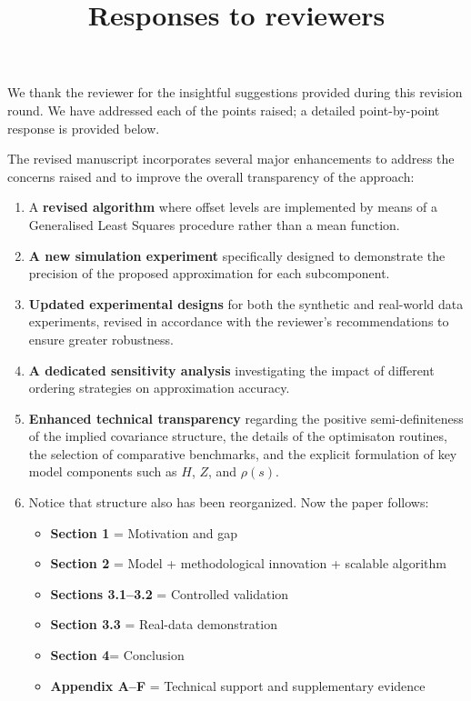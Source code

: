 \documentclass[12pt]{article}
\newcommand{\0}{\mathbf{0}}
\newcounter{reviewer}
\newcounter{point}[reviewer]
\begin{document}
\author{ }

\date{}
\title{Responses to reviewers}
\maketitle

\vspace*{-1.0cm}

\begin{sf}
\noindent \noindent We thank the reviewer for the insightful suggestions provided during this revision round. We have addressed each of the points raised; a detailed point-by-point response is provided below. 

\noindent The revised manuscript incorporates several major enhancements to address the concerns raised and to improve the overall transparency of the approach:

\begin{enumerate}
 \item A \textbf{revised algorithm} where offset levels are implemented by means of a Generalised Least Squares procedure rather than a mean function.
    \item \textbf{A new simulation experiment} specifically designed to demonstrate the precision  of the proposed approximation for each subcomponent.
    \item \textbf{Updated experimental designs} for both the synthetic and real-world data experiments, revised in accordance with the reviewer’s recommendations to ensure greater robustness.
    \item \textbf{A dedicated sensitivity analysis} investigating the impact of different ordering strategies on approximation accuracy.
    \item \textbf{Enhanced technical transparency} regarding the positive semi-definiteness of the implied covariance structure, the details of the optimisaton routines, the selection of comparative benchmarks, and the explicit formulation of key model components such as $H$, $Z$, and $\rho(s)$.
\item Notice that structure also has been reorganized. Now the paper follows: \begin{itemize}
    \item \textbf{Section 1} = Motivation and gap
    \item \textbf{Section 2} = Model + methodological innovation + scalable algorithm
    \item \textbf{Sections 3.1--3.2} = Controlled validation
    \item \textbf{Section 3.3} = Real-data demonstration
    \item \textbf{Section 4}= Conclusion
    \item \textbf{Appendix A--F} = Technical support and supplementary evidence
\end{itemize}

    
\end{enumerate}


\end{sf}
\end{document}
